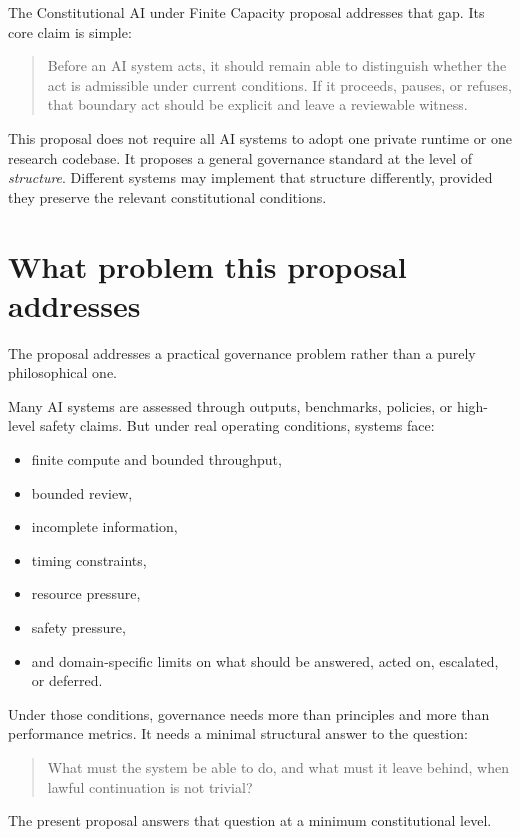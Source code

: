 \documentclass[11pt]{article}
\begin{document}
The Constitutional AI under Finite Capacity proposal addresses that gap. Its core claim is simple:

\begin{quote}
Before an AI system acts, it should remain able to distinguish whether the act is admissible under current conditions. If it proceeds, pauses, or refuses, that boundary act should be explicit and leave a reviewable witness.
\end{quote}

This proposal does not require all AI systems to adopt one private runtime or one research codebase. It proposes a general governance standard at the level of \emph{structure}. Different systems may implement that structure differently, provided they preserve the relevant constitutional conditions.

\section{What problem this proposal addresses}

The proposal addresses a practical governance problem rather than a purely philosophical one.

Many AI systems are assessed through outputs, benchmarks, policies, or high-level safety claims. But under real operating conditions, systems face:
\begin{itemize}[leftmargin=2em]
    \item finite compute and bounded throughput,
    \item bounded review,
    \item incomplete information,
    \item timing constraints,
    \item resource pressure,
    \item safety pressure,
    \item and domain-specific limits on what should be answered, acted on, escalated, or deferred.
\end{itemize}

Under those conditions, governance needs more than principles and more than performance metrics. It needs a minimal structural answer to the question:

\begin{quote}
What must the system be able to do, and what must it leave behind, when lawful continuation is not trivial?
\end{quote}

The present proposal answers that question at a minimum constitutional level.
\end{document}
